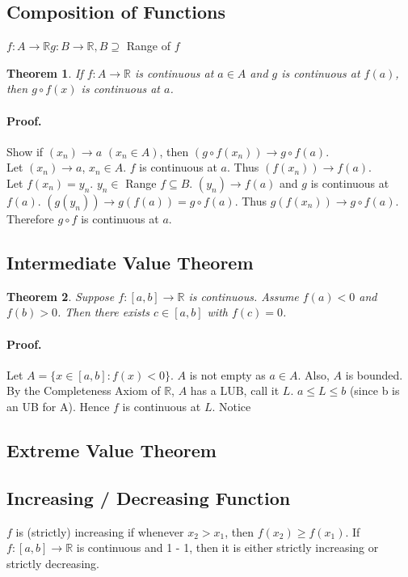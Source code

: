 \documentclass[11pt]{article}
\newcommand{\R}{{\mathbb R}}
\newtheorem {thm}{Theorem}
\begin{document}
\subsection{Composition of Functions}
$f: A \longrightarrow \R g: B \longrightarrow \R, B \supseteq$ Range of $f$

\begin{thm}
If $f: A \longrightarrow \R$ is continuous at $a \in A$ and $g$ is continuous at $f(a)$, then $g \circ f(x)$ is continuous at $a$.
\end{thm}
\paragraph{Proof.} 
Show if $(x_n) \to a$ $(x_n \in A)$, then $(g \circ f(x_n)) \to g \circ f(a)$.\\
Let $(x_n) \to a$, $x_n \in A$. $f$ is continuous at $a$. Thus $(f(x_n)) \to f(a)$.\\
Let $f(x_n) = y_n$. $y_n \in$ Range $f \subseteq B$. $(y_n) \to f(a)$ and $g$ is continuous at $f(a)$.
$(g(y_n)) \to g(f(a)) = g \circ f(a)$. Thus $g(f(x_n)) \to g \circ f(a)$. Therefore $g \circ f$ is continuous at $a$.

\subsection{Intermediate Value Theorem}
\begin{thm}
Suppose $f: [a, b] \to \R$ is continuous. Assume $f(a) < 0$ and $f(b) > 0$. Then there exists $c \in [a, b]$ with $f(c) = 0$.
\end{thm}
\paragraph{Proof.}
Let $A = \{x \in [a, b]: f(x) < 0\}$. $A$ is not empty  as $a \in A$. Also, $A$ is bounded. By the Completeness Axiom of
$\R$, $A$ has a LUB, call it $L$. $a \leq L \leq b$ (since b is an UB for A). Hence $f$ is continuous at $L$. Notice

\subsection{Extreme Value Theorem}

\subsection{Increasing / Decreasing Function}
$f$ is (strictly) increasing if whenever $x_2 > x_1$, then $f(x_2) \geq f(x_1)$.
If $f:[a, b] \to \R$ is continuous and 1 - 1, then it is either strictly increasing or strictly decreasing.
\end{document}
